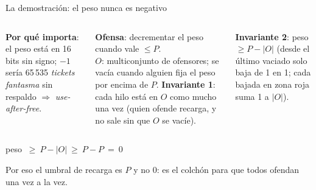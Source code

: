 \documentclass[aspectratio=169,11pt]{beamer}
\newcommand{\elexpositor}{}
\newcommand{\expone}[1]{\renewcommand{\elexpositor}{#1}}
\begin{document}
\expone{Diego}

\begin{frame}{La demostración: el peso nunca es negativo}
  \begin{columns}[T]
    \small
    \textbf{Por qué importa}: el peso está en 16 bits sin signo; $-1$ sería 65\,535 \emph{tickets fantasma} sin respaldo $\Rightarrow$ \emph{use-after-free}.\par\medskip
    \textbf{Ofensa}: decrementar el peso cuando vale $\le P$.\\
    \textbf{$O$}: multiconjunto de ofensores; se vacía cuando alguien fija el peso por encima de $P$.
    \small
    \textbf{Invariante 1}: cada hilo está en $O$ como mucho una vez (quien ofende recarga, y no sale sin que $O$ se vacíe).\par\medskip
    \textbf{Invariante 2}: peso $\ge P - |O|$ (desde el último vaciado solo baja de 1 en 1; cada bajada en zona roja suma 1 a $|O|$).
  \end{columns}
  \bigskip
  \begin{block}{}
    \centering\large peso $\ \ge\ P - |O|\ \ge\ P - P\ =\ 0$
  \end{block}
  \small Por eso el umbral de recarga es $P$ y no 0: es el colchón para que todos ofendan una vez a la vez.
\end{frame}
\end{document}
